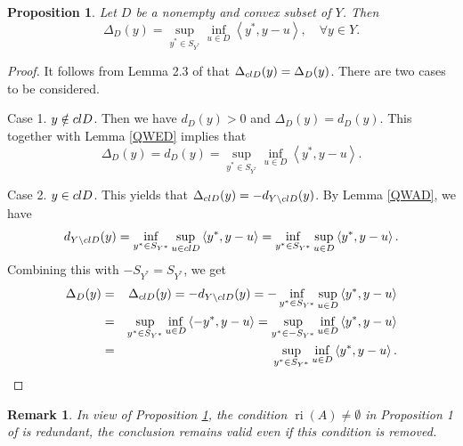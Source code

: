 \documentclass[10pt,a4paper]{amsart}
\newtheorem{proposition}{Proposition}[section]
\newtheorem{remark}{Remark}[section]
\begin{document}
\begin{proposition} \label{wqaz} Let $D$ be a nonempty and convex subset of $Y$. Then 
	$${\Delta _D}(y) = \mathop {\sup }\limits_{{y^*} \in {S_{{Y^*}}}} \mathop {\inf }\limits_{u \in D} \left\langle {{y^*},y - u} \right\rangle , \quad \forall y \in Y.$$	
\end{proposition} 
\begin{proof}  It follows from      Lemma 2.3 of \cite{Han2022} that ${\Delta _{{\rm{cl}}D}}(y) = {\Delta _D}(y)$.  There are two cases to be considered.

Case 1. $y \notin {\rm{cl}}D$. Then we have ${d_D}\left( y \right) > 0$ and ${\Delta _D}\left( y \right) = {d_D}\left( y \right)$. This together with  Lemma  \ref{QWED}  implies that 
$${\Delta _D}\left( y \right) = {d_D}\left( y \right) = \mathop {\sup }\limits_{{y^*} \in {S_{{Y^*}}}} \mathop {\inf }\limits_{u \in D} \left\langle {{y^*},y - u} \right\rangle .$$	

Case 2. $y \in {\rm{cl}}D$.  This yields    that ${\Delta _{{\rm{cl}}D}}(y) =  - {d_{Y\backslash {\rm{cl}}D}}(y)$. By Lemma  \ref{QWAD}, we have 
$${d_{Y\backslash {\rm{cl}}D}}(y) = \mathop {\inf }\limits_{{y^*} \in {S_{{Y^*}}}} \mathop {\sup }\limits_{u \in {\rm{cl}}D} \left\langle {{y^*},y - u} \right\rangle = \mathop {\inf }\limits_{{y^*} \in {S_{{Y^*}}}} \mathop {\sup }\limits_{u \in D} \left\langle {{y^*},y - u} \right\rangle .$$
Combining this with  $ - {S_{{Y^*}}} = {S_{{Y^*}}}$, we get
\begin{eqnarray*} {\Delta _D}(y) &=& {\Delta _{{\rm{cl}}D}}(y) =  - {d_{Y\backslash {\rm{cl}}D}}(y) = - \mathop {\inf }\limits_{{y^*} \in {S_{{Y^*}}}} \mathop {\sup }\limits_{u \in D} \left\langle {{y^*},y - u} \right\rangle \\
	&=& \mathop {\sup }\limits_{{y^*} \in {S_{{Y^*}}}} \mathop {\inf }\limits_{u \in D} \left\langle { - {y^*},y - u} \right\rangle = \mathop {\sup }\limits_{{y^*} \in  - {S_{{Y^*}}}} \mathop {\inf }\limits_{u \in D} \left\langle {{y^*},y - u} \right\rangle  \\
	&=& \mathop {\sup }\limits_{{y^*} \in {S_{{Y^*}}}} \mathop {\inf }\limits_{u \in D} \left\langle {{y^*},y - u} \right\rangle .		
\end{eqnarray*}
 \end{proof}  


\begin{remark}  In view of Proposition \ref{wqaz},       the condition \(\operatorname{ri}(A) \neq \emptyset\) in Proposition 1 of \cite{LiuNgYang2009} is redundant,  the conclusion remains valid even if this condition is removed.
   \end{remark}
\end{document}
